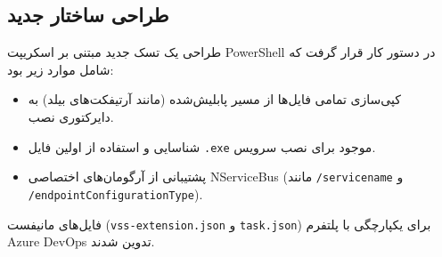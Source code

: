 \documentclass[a4paper,12pt]{article}
\begin{document}
\subsection*{طراحی ساختار جدید}
طراحی یک تسک جدید مبتنی بر اسکریپت PowerShell در دستور کار قرار گرفت که شامل موارد زیر بود:
\begin{itemize}
    \item کپی‌سازی تمامی فایل‌ها از مسیر پابلیش‌شده (مانند آرتیفکت‌های بیلد) به دایرکتوری نصب.
    \item شناسایی و استفاده از اولین فایل \texttt{.exe} موجود برای نصب سرویس.
    \item پشتیبانی از آرگومان‌های اختصاصی NServiceBus (مانند \texttt{/servicename} و \texttt{/endpointConfigurationType}).
\end{itemize}
فایل‌های مانیفست (\texttt{vss-extension.json} و \texttt{task.json}) برای یکپارچگی با پلتفرم Azure DevOps تدوین شدند.
\end{document}
